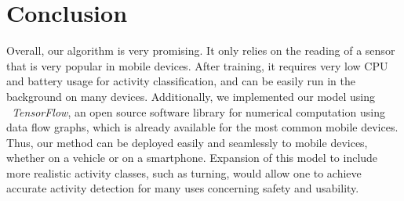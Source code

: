 \documentclass{article}
\begin{document}
\section{Conclusion}
\vspace{-.3cm}
Overall, our algorithm is very promising. It only relies on the reading of a sensor that is very
popular in mobile devices. After training, it requires very low CPU and battery usage for
activity classification, and can be easily run in the background on many devices.
Additionally, we implemented our model using \textit{\ TensorFlow}, an open source software
library for numerical computation using data flow graphs, which is already available for the most
common mobile devices. Thus, our method can be deployed easily and seamlessly to mobile
devices, whether on a vehicle or on a smartphone. Expansion of this model to include more
realistic activity classes, such as turning, would allow one to achieve accurate activity
detection for many uses concerning safety and usability.


{\scriptsize%

}
\end{document}

